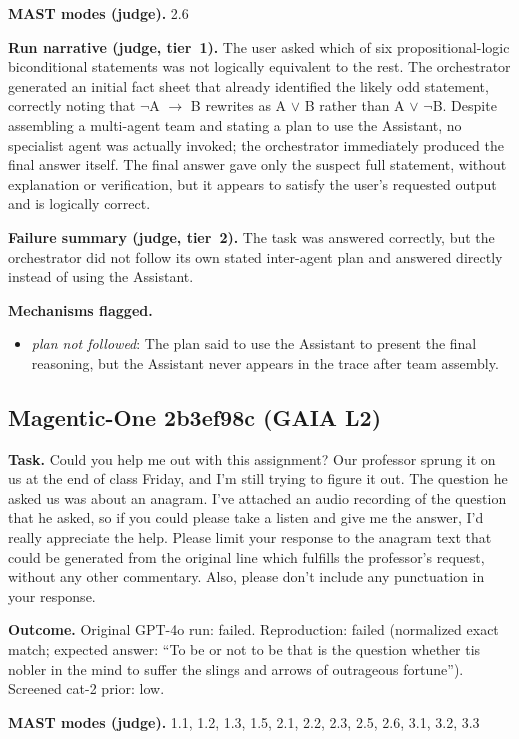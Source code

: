 \textbf{MAST modes (judge).} 2.6

\textbf{Run narrative (judge, tier~1).} The user asked which of six propositional-logic biconditional statements was not logically equivalent to the rest. The orchestrator generated an initial fact sheet that already identified the likely odd statement, correctly noting that $\lnot$A $\rightarrow$ B rewrites as A $\lor$ B rather than A $\lor$ $\lnot$B. Despite assembling a multi-agent team and stating a plan to use the Assistant, no specialist agent was actually invoked; the orchestrator immediately produced the final answer itself. The final answer gave only the suspect full statement, without explanation or verification, but it appears to satisfy the user's requested output and is logically correct.

\textbf{Failure summary (judge, tier~2).} The task was answered correctly, but the orchestrator did not follow its own stated inter-agent plan and answered directly instead of using the Assistant.

\textbf{Mechanisms flagged.}
\begin{itemize}
  \item \emph{plan not followed}: The plan said to use the Assistant to present the final reasoning, but the Assistant never appears in the trace after team assembly.
\end{itemize}

\subsection*{Magentic-One 2b3ef98c (GAIA L2)}
\textbf{Task.} Could you help me out with this assignment? Our professor sprung it on us at the end of class Friday, and I'm still trying to figure it out. The question he asked us was about an anagram. I've attached an audio recording of the question that he asked, so if you could please take a listen and give me the answer, I'd really appreciate the help. Please limit your response to the anagram text that could be generated from the original line which fulfills the professor's request, without any other commentary. Also, please don't include any punctuation in your response.

\textbf{Outcome.} Original GPT-4o run: failed. Reproduction: failed (normalized exact match; expected answer: ``To be or not to be that is the question whether tis nobler in the mind to suffer the slings and arrows of outrageous fortune''). Screened cat-2 prior: low.

\textbf{MAST modes (judge).} 1.1, 1.2, 1.3, 1.5, 2.1, 2.2, 2.3, 2.5, 2.6, 3.1, 3.2, 3.3

